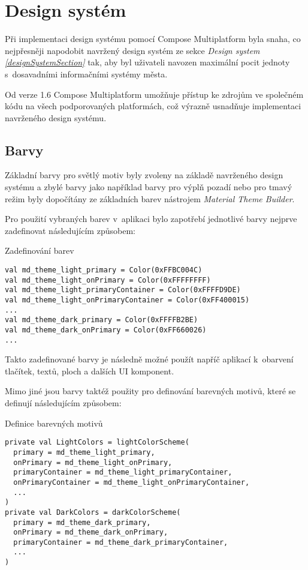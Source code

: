 \section{Design systém} \label{designSystemImpl}
Při implementaci design systému pomocí Compose Multiplatform byla snaha, co nejpřesněji napodobit navržený design systém ze sekce 
\textit{Design system \ref{designSystemSection}}
tak, aby byl uživateli navozen maximální pocit jednoty s~dosavadními informačními systémy města.

Od verze 1.6 Compose Multiplatform umožňuje přístup ke zdrojům ve společném kódu na všech podporovaných platformách, což výrazně usnadňuje 
implementaci navrženého design systému. 


\subsection*{Barvy} \label{colorSection}
Základní barvy pro světlý motiv byly zvoleny na základě navrženého design systému
a zbylé barvy jako například barvy pro výplň pozadí nebo pro tmavý režim byly dopočítány ze základních barev nástrojem \textit{Material Theme Builder}.

Pro použití vybraných barev v~aplikaci bylo zapotřebí jednotlivé barvy nejprve zadefinovat následujícím způsobem:

\begin{listing}[H]
\caption{Zadefinování barev}\label{lst:Colors}
\begin{verbatim}
val md_theme_light_primary = Color(0xFFBC004C)
val md_theme_light_onPrimary = Color(0xFFFFFFFF)
val md_theme_light_primaryContainer = Color(0xFFFFD9DE)
val md_theme_light_onPrimaryContainer = Color(0xFF400015)
...
val md_theme_dark_primary = Color(0xFFFFB2BE)
val md_theme_dark_onPrimary = Color(0xFF660026)
...
\end{verbatim}
\end{listing}

Takto zadefinované barvy je následně možné použít napříč aplikací k~obarvení tlačítek, textů, ploch a dalších UI komponent.

Mimo jiné jsou barvy taktéž použity pro definování barevných motivů, které se definují následujícím způsobem:
\begin{listing}[H]
\caption{Definice barevných motivů}\label{lst:ThemeDef}
\begin{verbatim}
private val LightColors = lightColorScheme(
  primary = md_theme_light_primary,
  onPrimary = md_theme_light_onPrimary,
  primaryContainer = md_theme_light_primaryContainer,
  onPrimaryContainer = md_theme_light_onPrimaryContainer,
  ...
)
private val DarkColors = darkColorScheme(
  primary = md_theme_dark_primary,
  onPrimary = md_theme_dark_onPrimary,
  primaryContainer = md_theme_dark_primaryContainer,
  ...
)
\end{verbatim}
\end{listing}

